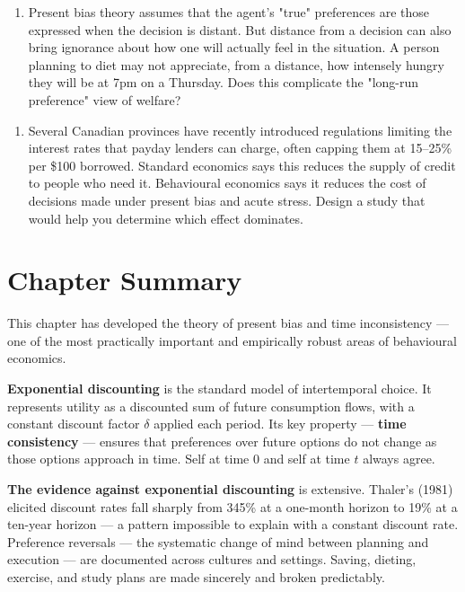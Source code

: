 \documentclass[12pt, letterpaper]{article}
\begin{document}
\begin{enumerate}
\item Present bias theory assumes that the agent's "true" preferences are those expressed when the decision is distant. But distance from a decision can also bring ignorance about how one will actually feel in the situation. A person planning to diet may not appreciate, from a distance, how intensely hungry they will be at 7pm on a Thursday. Does this complicate the "long-run preference" view of welfare?
\end{enumerate}

\begin{enumerate}
\item Several Canadian provinces have recently introduced regulations limiting the interest rates that payday lenders can charge, often capping them at 15--25\% per \$100 borrowed. Standard economics says this reduces the supply of credit to people who need it. Behavioural economics says it reduces the cost of decisions made under present bias and acute stress. Design a study that would help you determine which effect dominates.
\end{enumerate}

\medskip


\section*{Chapter Summary}


This chapter has developed the theory of present bias and time inconsistency --- one of the most practically important and empirically robust areas of behavioural economics.

\textbf{Exponential discounting} is the standard model of intertemporal choice. It represents utility as a discounted sum of future consumption flows, with a constant discount factor $\delta$ applied each period. Its key property --- \textbf{time consistency} --- ensures that preferences over future options do not change as those options approach in time. Self at time 0 and self at time $t$ always agree.

\textbf{The evidence against exponential discounting} is extensive. Thaler's (1981) elicited discount rates fall sharply from 345\% at a one-month horizon to 19\% at a ten-year horizon --- a pattern impossible to explain with a constant discount rate. Preference reversals --- the systematic change of mind between planning and execution --- are documented across cultures and settings. Saving, dieting, exercise, and study plans are made sincerely and broken predictably.
\end{document}
